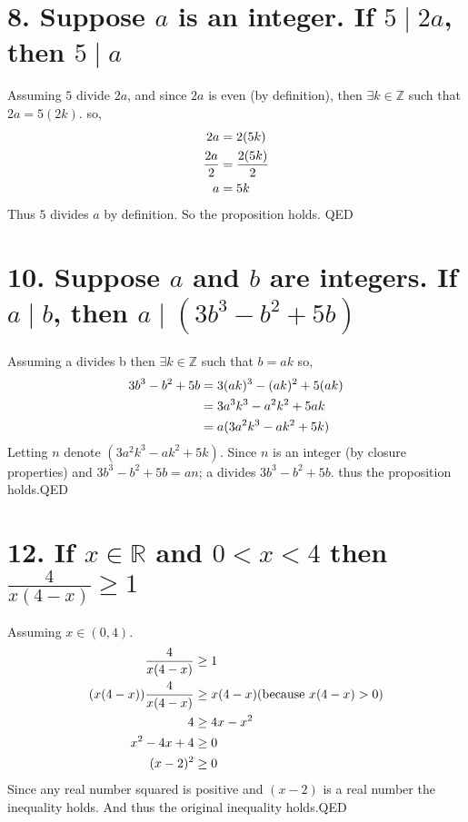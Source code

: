 \documentclass{article}
\begin{document}
\section*{8. Suppose $a$ is an integer. If $5 \mid 2a$, then  $5 \mid a $}
Assuming $5$ divide $2a$, and since $2a$ is even (by definition), then $\exists k \in \mathbb{Z}$ such that $2a = 5(2k)$.
so,  
\begin{equation}\notag
	\begin{aligned}
		2a &= 2(5k)\\
		\frac{2a}{2} &= \frac{2(5k)}{2}\\
				a	 &= 5k   
	\end{aligned}
\end{equation}
Thus $5$ divides $a$ by definition. So the proposition holds. \hfill QED

\section*{10. Suppose $a$ and $b$ are integers. If $a \mid b$, then $a \mid (3b^3-b^2+5b)$}
Assuming a divides b then $\exists k \in \mathbb{Z} $ such that $b=ak$
so,  
\begin{equation}\notag
	\begin{aligned}
		 3b^3-b^2+5b &= 3(ak)^3-(ak)^2+5(ak)\\
		 			 &= 3a^3k^3-a^2k^2+5ak\\
		 			 &= a(3a^2k^3-ak^2+5k)
	\end{aligned}
\end{equation}
Letting $n$ denote $(3a^2k^3-ak^2+5k)$. Since $n$ is an integer (by closure properties) and  $3b^3-b^2+5b = an$; a divides $3b^3-b^2+5b$. thus the proposition holds.\hfill QED

\section*{12. If $x \in \mathbb{R}$ and $0 < x < 4$ then $\frac{4}{x(4-x)} \ge 1 $ }
Assuming $x \in (0,4)$. 
\begin{equation}\notag
	\begin{aligned}
		\frac{4}{x(4-x)} &\ge 1\\
		(x(4-x)) \frac{4}{x(4-x)} &\ge x(4-x) \text{(because $x(4-x)>0$)}\\
		4 &\ge 4x-x^2 \\
		x^2-4x +4 &\ge 0 \\
		(x-2)^2 &\ge 0 \\
	\end{aligned}
\end{equation}
Since any real number squared is positive and $(x-2)$ is a real number the inequality holds. And thus the original inequality holds.\hfill QED
\end{document}
